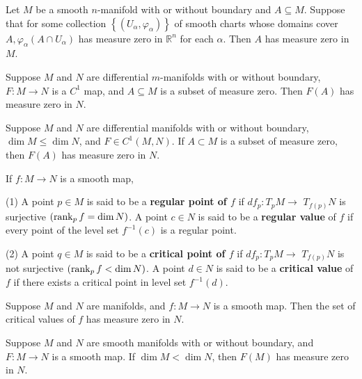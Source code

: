 \documentclass[12pt, oneside]{book}
\begin{document}
\begin{lemma}
    Let $M$ be a smooth $n$-manifold with or without boundary and $A \subseteq M$. Suppose that for some collection $\left\{\left(U_\alpha, \varphi_\alpha\right)\right\}$ of smooth charts whose domains cover $A, \varphi_\alpha\left(A \cap U_\alpha\right)$ has measure zero in $\mathbb{R}^n$ for each $\alpha$. Then $A$ has measure zero in $M$.
\end{lemma}

\begin{theorem}
    Suppose $M$ and $N$ are differential $m$-manifolds with or without boundary, $F: M \rightarrow N$ is a $C^1$ map, and $A \subseteq M$ is a subset of measure zero. Then $F(A)$ has measure zero in $N$.
\end{theorem}

\begin{corollary}
    Suppose $M$ and $N$ are differential manifolds with or without boundary, $\dim M \leq \dim N$, and $F \in C^1\left(M,N\right)$.
    If $A \subset M$ is a subset of measure zero, then $F(A)$ has measure zero in $N$.
\end{corollary}




\begin{definition}
    If $f: M \rightarrow N$ is a smooth map,

    (1) A point $p \in M$ is said to be a \textbf{regular point of $f$} if $d f_p: T_p M \rightarrow$ $T_{f(p)} N$ is surjective $\left(\rank_p f =\dim N\right)$.
    A point $c \in N$ is said to be a \textbf{regular value} of $f$ if every point of the level set $f^{-1}(c)$ is a regular point.

    (2) A point $q \in M$ is said to be a \textbf{critical point of $f$} if $d f_p: T_p M \rightarrow$ $T_{f(p)} N$ is not surjective $\left(\rank_p f <\dim N\right)$.
    A point $d \in N$ is said to be a \textbf{critical value} of $f$ if there exists a critical point in level set $f^{-1}(d)$.
\end{definition}

\begin{theorem}
    Suppose $M$ and $N$ are manifolds, and $f: M \rightarrow N$ is a smooth map.
    Then the set of critical values of $f$ has measure zero in $N$.
\end{theorem}


\begin{corollary}
    Suppose $M$ and $N$ are smooth manifolds with or without boundary, and $F: M \rightarrow N$ is a smooth map. If $\operatorname{dim} M<\operatorname{dim} N$, then $F(M)$ has measure zero in $N$.
\end{corollary}
\end{document}
